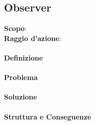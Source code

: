 \subsection{Observer}
\label{observer}

\textbf{Scopo}:  \\
\textbf{Raggio d'azione}: 

\paragraph{Definizione}

\paragraph{Problema}

\paragraph{Soluzione} 

\paragraph{Struttura e Conseguenze} 

\newpage